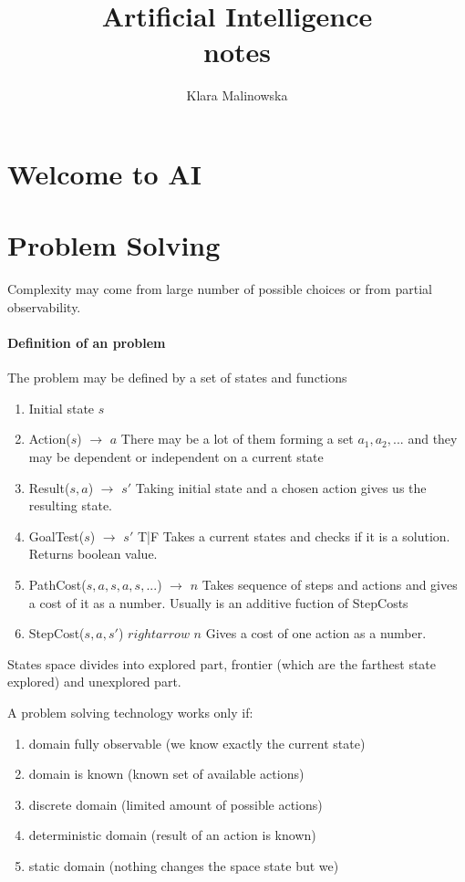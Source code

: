 \documentclass[a4paper,10pt]{article}
\title{Artificial Intelligence \\ notes}
\author{Klara Malinowska}
\begin{document}
\maketitle
\section{Welcome to AI}
\section{Problem Solving}

Complexity may come from large number of possible choices or from partial observability.

\paragraph{Definition of an problem}
The problem may be defined by a set of states and functions
\begin{enumerate}
  \item Initial state $s$
  \item Action($s$) $\rightarrow$ $a$ There may be a lot of them forming a set ${a_1, a_2, ...}$ and they may be dependent or independent on a current state
  \item Result($s,a$) $\rightarrow$ $s'$ Taking initial state and a chosen action gives us the resulting state.
  \item GoalTest($s$) $\rightarrow$ $s'$ T|F Takes a current states and checks if it is a solution. Returns boolean value.
  \item PathCost($s,a,s,a,s,...$) $\rightarrow$ $n$ Takes sequence of steps and actions and gives a cost of it as a number. Usually is an additive fuction of StepCosts
  \item StepCost($s,a,s'$) $rightarrow$ $n$ Gives a cost of one action as a number.
\end{enumerate}

States space divides into explored part, frontier (which are the farthest state explored) and unexplored part.

A problem solving technology works only if:
\begin{enumerate}
 \item domain fully observable (we know exactly the current state)
 \item domain is known (known set of available actions)
 \item discrete domain (limited amount of possible actions)
 \item deterministic domain (result of an action is known)
 \item static domain (nothing changes the space state but we)
\end{enumerate}
\end{document}
